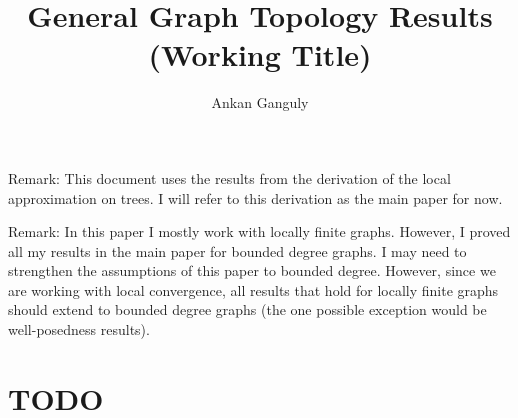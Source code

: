 \documentclass[12pt]{article}
\newcommand{\skipLine}{\vspace{12pt}}
\begin{document}
\title{General Graph Topology Results (Working Title)}
\author{Ankan Ganguly}

\maketitle

Remark: This document uses the results from the derivation of the local approximation on trees. I will refer to this derivation as the main paper for now.

\skipLine

Remark: In this paper I mostly work with locally finite graphs. However, I proved all my results in the main paper for bounded degree graphs. I may need to strengthen the assumptions of this paper to bounded degree. However, since we are working with local convergence, all results that hold for locally finite graphs should extend to bounded degree graphs (the one possible exception would be well-posedness results).

\section{TODO}
\end{document}
